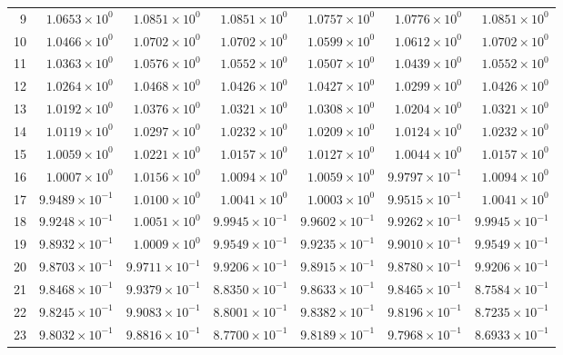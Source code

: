 \begin{table}[H]
\begin{tabular}{@{}rrrrrrr@{}}
9 & $1.0653\times10^{0}$ & $1.0851\times10^{0}$ & $1.0851\times10^{0}$ & $1.0757\times10^{0}$ & $1.0776\times10^{0}$ & $1.0851\times10^{0}$\\
10 & $1.0466\times10^{0}$ & $1.0702\times10^{0}$ & $1.0702\times10^{0}$ & $1.0599\times10^{0}$ & $1.0612\times10^{0}$ & $1.0702\times10^{0}$\\
11 & $1.0363\times10^{0}$ & $1.0576\times10^{0}$ & $1.0552\times10^{0}$ & $1.0507\times10^{0}$ & $1.0439\times10^{0}$ & $1.0552\times10^{0}$\\
12 & $1.0264\times10^{0}$ & $1.0468\times10^{0}$ & $1.0426\times10^{0}$ & $1.0427\times10^{0}$ & $1.0299\times10^{0}$ & $1.0426\times10^{0}$\\
13 & $1.0192\times10^{0}$ & $1.0376\times10^{0}$ & $1.0321\times10^{0}$ & $1.0308\times10^{0}$ & $1.0204\times10^{0}$ & $1.0321\times10^{0}$\\
14 & $1.0119\times10^{0}$ & $1.0297\times10^{0}$ & $1.0232\times10^{0}$ & $1.0209\times10^{0}$ & $1.0124\times10^{0}$ & $1.0232\times10^{0}$\\
15 & $1.0059\times10^{0}$ & $1.0221\times10^{0}$ & $1.0157\times10^{0}$ & $1.0127\times10^{0}$ & $1.0044\times10^{0}$ & $1.0157\times10^{0}$\\
16 & $1.0007\times10^{0}$ & $1.0156\times10^{0}$ & $1.0094\times10^{0}$ & $1.0059\times10^{0}$ & $9.9797\times10^{-1}$ & $1.0094\times10^{0}$\\
17 & $9.9489\times10^{-1}$ & $1.0100\times10^{0}$ & $1.0041\times10^{0}$ & $1.0003\times10^{0}$ & $9.9515\times10^{-1}$ & $1.0041\times10^{0}$\\
18 & $9.9248\times10^{-1}$ & $1.0051\times10^{0}$ & $9.9945\times10^{-1}$ & $9.9602\times10^{-1}$ & $9.9262\times10^{-1}$ & $9.9945\times10^{-1}$\\
19 & $9.8932\times10^{-1}$ & $1.0009\times10^{0}$ & $9.9549\times10^{-1}$ & $9.9235\times10^{-1}$ & $9.9010\times10^{-1}$ & $9.9549\times10^{-1}$\\
20 & $9.8703\times10^{-1}$ & $9.9711\times10^{-1}$ & $9.9206\times10^{-1}$ & $9.8915\times10^{-1}$ & $9.8780\times10^{-1}$ & $9.9206\times10^{-1}$\\
21 & $9.8468\times10^{-1}$ & $9.9379\times10^{-1}$ & $8.8350\times10^{-1}$ & $9.8633\times10^{-1}$ & $9.8465\times10^{-1}$ & $8.7584\times10^{-1}$\\
22 & $9.8245\times10^{-1}$ & $9.9083\times10^{-1}$ & $8.8001\times10^{-1}$ & $9.8382\times10^{-1}$ & $9.8196\times10^{-1}$ & $8.7235\times10^{-1}$\\
23 & $9.8032\times10^{-1}$ & $9.8816\times10^{-1}$ & $8.7700\times10^{-1}$ & $9.8189\times10^{-1}$ & $9.7968\times10^{-1}$ & $8.6933\times10^{-1}$\\

\end{tabular}
\end{table}
